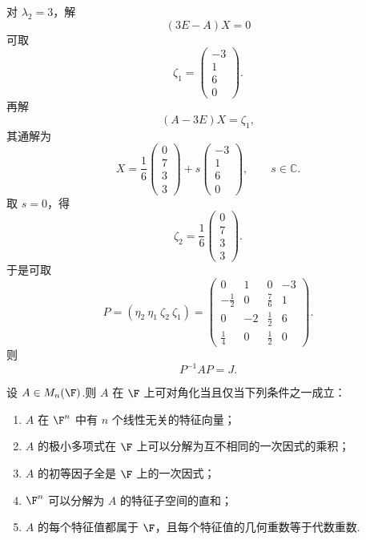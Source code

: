 \begin{example}
	对 $\lambda_2=3$，解
	\[
	(3E-A)X=0
	\]
	可取
	\[
	\zeta_1=
	\begin{pmatrix}
		-3\\1\\6\\0
	\end{pmatrix}.
	\]
	再解
	\[
	(A-3E)X=\zeta_1,
	\]
	其通解为
	\[
	X=\frac16
	\begin{pmatrix}
		0\\7\\3\\3
	\end{pmatrix}
	+s
	\begin{pmatrix}
		-3\\1\\6\\0
	\end{pmatrix},
	\qquad s\in\mathbb{C}.
	\]
	取 $s=0$，得
	\[
	\zeta_2=\frac16
	\begin{pmatrix}
		0\\7\\3\\3
	\end{pmatrix}.
	\]
	于是可取
	\[
	P=(\eta_2\ \eta_1\ \zeta_2\ \zeta_1)
	=
	\begin{pmatrix}
		0&1&0&-3\\
		-\frac12&0&\frac76&1\\
		0&-2&\frac12&6\\
		\frac14&0&\frac12&0
	\end{pmatrix}.
	\]
	则
	\[
	P^{-1}AP=J.
	\]
\end{example}

\begin{proposition}
	设 $A\in M_n(\F)$.则 $A$ 在 $\F$ 上可对角化当且仅当下列条件之一成立：
	\begin{enumerate}
		\item $A$ 在 $\F^n$ 中有 $n$ 个线性无关的特征向量；
		\item $A$ 的极小多项式在 $\F$ 上可以分解为互不相同的一次因式的乘积；
		\item $A$ 的初等因子全是 $\F$ 上的一次因式；
		\item $\F^n$ 可以分解为 $A$ 的特征子空间的直和；
		\item $A$ 的每个特征值都属于 $\F$，且每个特征值的几何重数等于代数重数.
	\end{enumerate}
\end{proposition}
